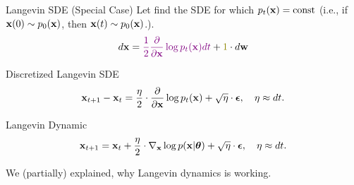 \documentclass{beamer}
\begin{document}
\begin{frame}{Langevin SDE (Special Case)}
	Let find the SDE for which $p_t(\mathbf{x}) = \text{const}$ (i.e., if $\mathbf{x}(0) \sim p_0(\mathbf{x})$, then $\mathbf{x}(t) \sim p_0(\mathbf{x})$.).
	\[
		d \bx = {\color{violet}\frac{1}{2} \frac{\partial}{\partial \bx} \log p_t(\bx) d t} + {\color{olive}1} \cdot d \bw
	\]
	\eqpause
	\begin{block}{Discretized Langevin SDE}
		\vspace{-0.3cm}
		\[
			\mathbf{x}_{t + 1} - \mathbf{x}_t = \frac{\eta}{2} \cdot \frac{\partial}{\partial \mathbf{x}} \log p_t(\mathbf{x}) + \sqrt{\eta} \cdot \boldsymbol{\epsilon}, \quad \eta \approx dt.
		\]
		\vspace{-0.4cm}
	\end{block}
	\begin{block}{Langevin Dynamic}
		\vspace{-0.3cm}
		\[
			\mathbf{x}_{t + 1} = \mathbf{x}_t + \frac{\eta}{2} \cdot \nabla_{\mathbf{x}} \log p(\mathbf{x} | \boldsymbol{\theta}) + \sqrt{\eta} \cdot \boldsymbol{\epsilon}, \quad \eta \approx dt.
		\]
		\vspace{-0.3cm}
	\end{block}
	We (partially) explained, why Langevin dynamics is working.
\end{frame}
\end{document}
